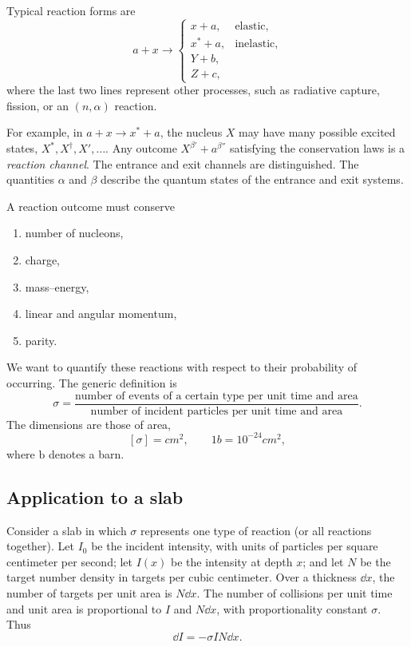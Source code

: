 Typical reaction forms are
\[
  a+x \longrightarrow
  \begin{cases}
    x+a, & \text{elastic},\\
    x^*+a, & \text{inelastic},\\
    Y+b,\\
    Z+c,
  \end{cases}
\]
where the last two lines represent other processes, such as radiative capture, fission, or an $(n,\alpha)$ reaction.

For example, in $a+x\to x^*+a$, the nucleus $X$ may have many possible excited states, $X^*,X^\dagger,X',\ldots$.  Any outcome $X^{\beta'}+a^{\beta''}$ satisfying the conservation laws is a \emph{reaction channel}.  The entrance and exit channels are distinguished.  The quantities $\alpha$ and $\beta$ describe the quantum states of the entrance and exit systems.

A reaction outcome must conserve
\begin{enumerate}
  \item number of nucleons,
  \item charge,
  \item mass--energy,
  \item linear and angular momentum,
  \item parity.
\end{enumerate}

We want to quantify these reactions with respect to their probability of occurring.  The generic definition is
\[
  \sigma
  =\frac{\text{number of events of a certain type per unit time and area}}
  {\text{number of incident particles per unit time and area}}.
\]
The dimensions are those of area,
\[
  [\sigma]=\unit{cm^2},
  \qquad
  1\unit{b}=10^{-24}\unit{cm^2},
\]
where $\mathrm{b}$ denotes a barn.

\subsection*{Application to a slab}
Consider a slab in which $\sigma$ represents one type of reaction (or all reactions together).  Let $I_0$ be the incident intensity, with units of particles per square centimeter per second; let $I(x)$ be the intensity at depth $x$; and let $N$ be the target number density in targets per cubic centimeter.  Over a thickness $\dd x$, the number of targets per unit area is $N\dd x$.  The number of collisions per unit time and unit area is proportional to $I$ and $N\dd x$, with proportionality constant $\sigma$.  Thus
\[
  \dd I=-\sigma I N\dd x.
\]


